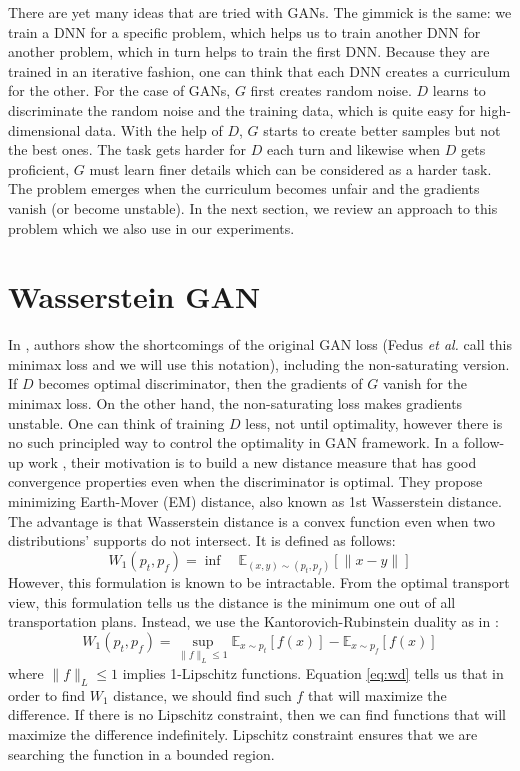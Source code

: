 \documentclass[a4paper,onesided,12pt]{report}
\begin{document}
There are yet many ideas that are tried with GANs. The gimmick is the same: we train a DNN for a specific problem, which helps us to train another DNN for another problem, which in turn helps to train  the first DNN. Because they are trained in an iterative fashion, one can think that each DNN creates a curriculum for the other. For the case of GANs, $G$ first creates random noise. $D$ learns to discriminate the random noise and the training data, which is quite easy for high-dimensional data. With the help of $D$, $G$ starts to create better samples but not the best ones. The task gets harder for $D$ each turn and likewise when $D$ gets proficient, $G$ must learn finer details which can be considered as a harder task. The problem emerges when the curriculum becomes unfair and the gradients vanish (or become unstable). In the next section, we review an approach to this problem which we also use in our experiments.

\section{Wasserstein GAN}
\label{sec:wgan}
In \cite{arjovsky2017towards}, authors show the shortcomings of the original GAN loss (Fedus \textit{et al.} \cite{fedus2017many} call this minimax loss and we will use this notation), including the non-saturating version. If $D$ becomes optimal discriminator, then the gradients of $G$ vanish for the minimax loss. On the other hand, the non-saturating loss makes gradients unstable. One can think of training $D$ less, not until optimality, however there is no such principled way to control the optimality in GAN framework. In a follow-up work \cite{arjovsky2017wasserstein}, their motivation is to build a new distance measure that has good convergence properties even when the discriminator is optimal. They propose minimizing Earth-Mover (EM) distance, also known as 1st Wasserstein distance. The advantage is that Wasserstein distance is a convex function even when two distributions' supports do not intersect. It is defined as follows:
\begin{equation}
W_1(p_t, p_f) = \inf \quad \mathbb{E}_{(x,y) \sim (p_t, p_f)} [ \| x-y \| ]
\label{eq:emd}
\end{equation}
However, this formulation is known to be intractable. From the optimal transport view, this formulation tells us the distance is the minimum one out of all transportation plans. Instead, we use the Kantorovich-Rubinstein duality as in \cite{arjovsky2017wasserstein}:
\begin{equation}
W_1(p_t, p_f) = \underset{\|f\|_L \leq 1}{\sup} \mathbb{E}_{x\sim p_t} [f(x)] - \mathbb{E}_{x \sim p_f} [f(x)]
\label{eq:wd}
\end{equation}
where $\|f\|_L \leq 1$ implies 1-Lipschitz functions. Equation \ref{eq:wd} tells us that in order to find $W_1$ distance, we should find such $f$ that will maximize the difference. If there is no Lipschitz constraint, then we can find functions that will maximize the difference indefinitely. Lipschitz constraint ensures that we are searching the function in a bounded region.
\end{document}
